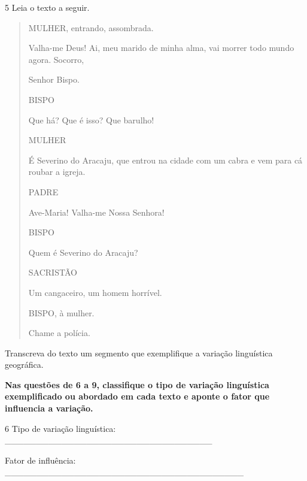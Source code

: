 \num{5} Leia o texto a seguir.

\begin{quote}

MULHER, entrando, assombrada.

Valha-me Deus! Ai, meu marido de minha alma, vai morrer todo mundo
agora. Socorro,

Senhor Bispo.

BISPO

Que há? Que é isso? Que barulho!

MULHER

É Severino do Aracaju, que entrou na cidade com um cabra e vem para cá
roubar a igreja.

PADRE

Ave-Maria! Valha-me Nossa Senhora!

BISPO

Quem é Severino do Aracaju?

SACRISTÃO

Um cangaceiro, um homem horrível.

BISPO, à mulher.

Chame a polícia.
\end{quote}


Transcreva do texto um segmento que exemplifique a variação linguística
geográfica.


\textbf{Nas questões de 6 a 9, classifique o tipo de variação
linguística exemplificado ou abordado em cada texto e aponte o fator que
influencia a variação.}

\num{6} Tipo de variação linguística:
\_\_\_\_\_\_\_\_\_\_\_\_\_\_\_\_\_\_\_\_\_\_\_\_\_\_\_\_\_\_\_\_\_

Fator de influência:
\_\_\_\_\_\_\_\_\_\_\_\_\_\_\_\_\_\_\_\_\_\_\_\_\_\_\_\_\_\_\_\_\_\_\_\_\_\_

